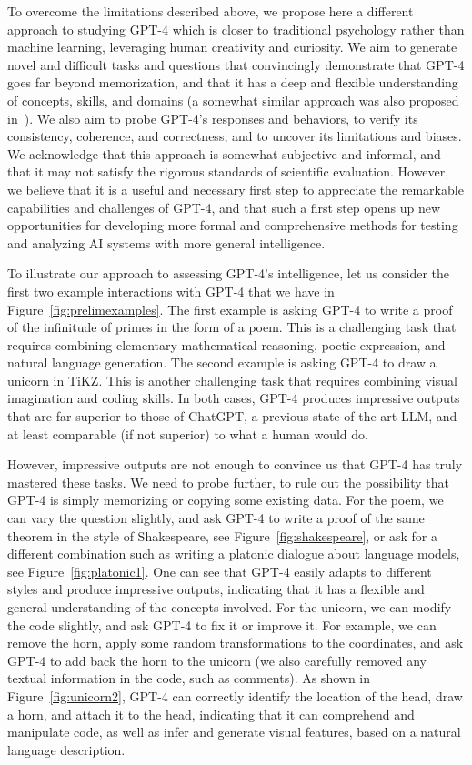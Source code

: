     To overcome the limitations described above, we propose here a different approach to studying {GPT-4} which is closer to traditional psychology rather than machine learning, leveraging human creativity and curiosity. We aim to generate novel and difficult tasks and questions that convincingly demonstrate that {GPT-4} goes far beyond memorization, and that it has a deep and flexible understanding of concepts, skills, and domains (a somewhat similar approach was also proposed in~\cite{collins2022structured}). We also aim to probe GPT-4's responses and behaviors, to verify its consistency, coherence, and correctness, and to uncover its limitations and biases. We acknowledge that this approach is somewhat subjective and informal, and that it may not satisfy the rigorous standards of scientific evaluation. However, we believe that it is a useful and necessary first step to appreciate the remarkable capabilities and challenges of GPT-4, and that such a first step opens up new opportunities for developing more formal and comprehensive methods for testing and analyzing AI systems with more general intelligence. 

    To illustrate our approach to assessing GPT-4's intelligence, let us consider the first two example interactions with {GPT-4} that we have in Figure~\ref{fig:prelimexamples}. The first example is asking {GPT-4} to write a proof of the infinitude of primes in the form of a poem. This is a challenging task that requires combining elementary mathematical reasoning, poetic expression, and natural language generation. The second example is asking {GPT-4} to draw a unicorn in TiKZ. This is another challenging task that requires combining visual imagination and coding skills. In both cases, {GPT-4} produces impressive outputs that are far superior to those of ChatGPT, a previous state-of-the-art LLM, and at least comparable (if not superior) to what a human would do. 

    However, impressive outputs are not enough to convince us that {GPT-4} has truly mastered these tasks. We need to probe further, to rule out the possibility that {GPT-4} is simply memorizing or copying some existing data. For the poem, we can vary the question slightly, and ask {GPT-4} to write a proof of the same theorem in the style of Shakespeare, see Figure~\ref{fig:shakespeare}, or ask for a different combination such as writing a platonic dialogue about language models, see Figure~\ref{fig:platonic1}. One can see that {GPT-4} easily adapts to different styles and produce impressive outputs, indicating that it has a flexible and general understanding of the concepts involved. For the unicorn, we can modify the code slightly, and ask {GPT-4} to fix it or improve it. For example, we can remove the horn, apply some random transformations to the coordinates, and ask {GPT-4} to add back the horn to the unicorn (we also carefully removed any textual information in the code, such as comments). As shown in Figure~\ref{fig:unicorn2}, {GPT-4} can correctly identify the location of the head, draw a horn, and attach it to the head, indicating that it can comprehend and manipulate code, as well as infer and generate visual features, based on a natural language description.

